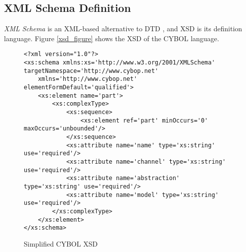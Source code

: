 %
%
%
%
%
%

\subsection{XML Schema Definition}
\label{xml_schema_definition_heading}

\emph{XML Schema} is an XML-based alternative to DTD \cite{w3schools}, and XSD
is its definition language. Figure \ref{xsd_figure} shows the XSD of the CYBOL
language.

\begin{figure}[ht]
    \bigskip
    \bigskip
    \begin{scriptsize}
        \begin{verbatim}
<?xml version="1.0"?>
<xs:schema xmlns:xs='http://www.w3.org/2001/XMLSchema' targetNamespace='http://www.cybop.net'
    xmlns='http://www.cybop.net' elementFormDefault='qualified'>
    <xs:element name='part'>
        <xs:complexType>
            <xs:sequence>
                <xs:element ref='part' minOccurs='0' maxOccurs='unbounded'/>
            </xs:sequence>
            <xs:attribute name='name' type='xs:string' use='required'/>
            <xs:attribute name='channel' type='xs:string' use='required'/>
            <xs:attribute name='abstraction' type='xs:string' use='required'/>
            <xs:attribute name='model' type='xs:string' use='required'/>
        </xs:complexType>
    </xs:element>
</xs:schema>
        \end{verbatim}
    \end{scriptsize}
    \caption{Simplified CYBOL XSD}
    \label{simplexsd_figure}
\end{figure}

